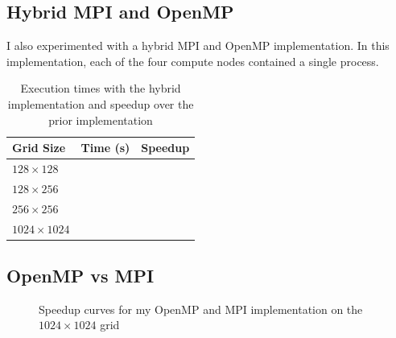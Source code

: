 \documentclass[twocolumn, a4paper]{article}
\begin{document}
\subsection{Hybrid MPI and OpenMP}

I also experimented with a hybrid MPI and OpenMP implementation.
In this implementation, each of the four compute nodes contained a single process.

\begin{table}[htbp]
  \begin{center}
  \caption{Execution times with the hybrid implementation and speedup over the prior implementation}\label{tab:hybrid}
  \begin{tabular}[t]{l | l l} 
      \hline\hline
      Grid Size&Time (s)&Speedup\\
      \hline
      $128 \times 128$&\texttt{}&\texttt{}\\
      $128 \times 256$&\texttt{}&\texttt{}\\
      $256 \times 256$&\texttt{}&\texttt{}\\
      $1024 \times 1024$&\texttt{}&\texttt{}\\
      \hline
    \end{tabular}
  \end{center}
\end{table}

\subsection{OpenMP vs MPI}

\begin{figure}[htpb]
  \centering
  \caption{Speedup curves for my OpenMP and MPI implementation on the $1024\times1024$ grid}\label{fig:scaling_openmp_mpi}
\end{figure}
\end{document}
